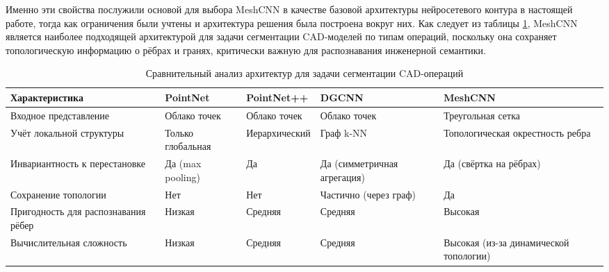 Именно эти свойства послужили основой для выбора MeshCNN в качестве базовой архитектуры нейросетевого контура в настоящей работе, тогда как ограничения были учтены и архитектура решения была построена вокруг них. Как следует из таблицы \ref{tab:cmp-3d-neural}, MeshCNN является наиболее подходящей архитектурой для задачи сегментации CAD-моделей по типам операций, поскольку она сохраняет топологическую информацию о рёбрах и гранях, критически важную для распознавания инженерной семантики.

\begin{table}[h]
\centering
\begin{tabular}{|p{3.5cm}|p{2.5cm}|p{2.5cm}|p{2.5cm}|p{2.5cm}|}
\hline
Характеристика & PointNet & PointNet++ & DGCNN & MeshCNN \\
\hline
Входное представление & Облако точек & Облако точек & Облако точек & Треугольная сетка \\
\hline
Учёт локальной структуры & Только глобальная & Иерар\-хи\-чес\-кий & Граф k-NN & То\-по\-ло\-ги\-чес\-кая окрестность ребра \\
\hline
Инвариантность к перестановке & Да (max pooling) & Да & Да (симметричная агрегация) & Да (свёртка на рёбрах) \\
\hline
Сохранение топологии & Нет & Нет & Частично (через граф) & Да \\
\hline
Пригодность для распознавания рёбер & Низкая & Средняя & Средняя & Высокая \\
\hline
Вы\-чис\-ли\-тель\-ная сложность & Низкая & Средняя & Средняя & Высокая (из-за динамической топологии) \\
\hline
\end{tabular}
\caption{Сравнительный анализ архитектур для задачи сегментации CAD-операций}
\label{tab:cmp-3d-neural}
\end{table}


